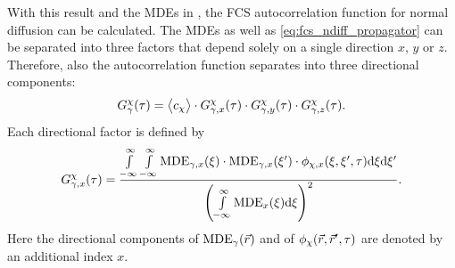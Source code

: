 With this result and the MDEs in , the FCS autocorrelation function for normal diffusion can be calculated. The MDEs as well as \eqref{eq:fcs_ndiff_propagator} can be separated into three factors that depend solely on a single direction $x$, $y$ or $z$. Therefore, also the autocorrelation function separates into three directional components:
\begin{equation}\label{eq:fcs_ndiff_cc_separated}
  G_{\gamma}^{\chi}(\tau)=\bigl\langle c_\chi\bigr\rangle\cdot G_{\gamma,x}^{\chi}(\tau)\cdot G_{\gamma,y}^{\chi}(\tau)\cdot G_{\gamma,z}^{\chi}(\tau).
\end{equation}
Each directional factor is defined by
\begin{equation}\label{eq:fcs_ndiff_cc_separated_dirfactor}
   G_{\gamma,x}^{\chi}(\tau)=\frac{\int\limits_{-\infty}^\infty\int\limits_{-\infty}^\infty\operatorname{MDE}_{\gamma,x}(\xi)\cdot\operatorname{MDE}_{\gamma,x}(\xi')\cdot\phi_{\chi,x}(\xi,\xi',\tau)\mathrm{d}\xi\mathrm{d}\xi'}{\left(\int\limits_{-\infty}^\infty\operatorname{MDE}_x(\xi)\mathrm{d}\xi\right)^2}.
\end{equation}
Here the directional components of $\operatorname{MDE}_\gamma(\vec{r})$ and of  $\phi_\chi(\vec{r},\vec{r}',\tau)$ are denoted by an additional index $x$.



